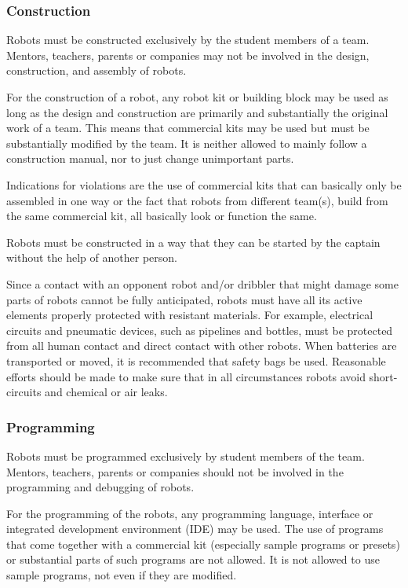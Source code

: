 \documentclass{article}
\begin{document}
\subsubsection{Construction \label{ref-057}}

Robots must be constructed exclusively by the student members of a team.
Mentors, teachers, parents or companies may not be involved in the design,
construction, and assembly of robots.

For the construction of a robot, any robot kit or building block may be used as
long as the design and construction are primarily and substantially the
original work of a team. This means that commercial kits may be used but must
be substantially modified by the team. It is neither allowed to mainly follow a
construction manual, nor to just change unimportant parts.

Indications for violations are the use of commercial kits that can basically
only be assembled in one way or the fact that robots from different team(s),
build from the same commercial kit, all basically look or function the same.

Robots must be constructed in a way that they can be started by the captain
without the help of another person.

Since a contact with an opponent robot and/or dribbler that might damage some
parts of robots cannot be fully anticipated, robots must have all its active
elements properly protected with resistant materials. For example, electrical
circuits and pneumatic devices, such as pipelines and bottles, must be
protected from all human contact and direct contact with other robots. When
batteries are transported or moved, it is recommended that safety bags be used.
Reasonable efforts should be made to make sure that in all circumstances robots
avoid short-circuits and chemical or air leaks.

\subsubsection{Programming \label{ref-058}}

Robots must be programmed exclusively by student members of the team. Mentors,
teachers, parents or companies should not be involved in the programming and
debugging of robots.

For the programming of the robots, any programming language, interface or
integrated development environment (IDE) may be used. The use of programs that
come together with a commercial kit (especially sample programs or presets) or
substantial parts of such programs are not allowed. It is not allowed to use
sample programs, not even if they are modified.
\end{document}
